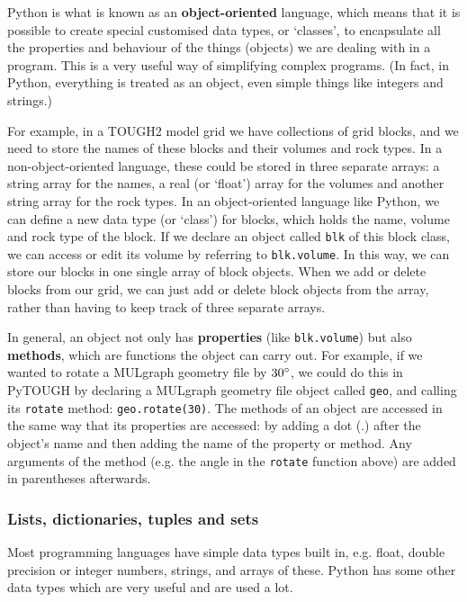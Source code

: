 Python is what is known as an \textbf{object-oriented} language, which means that it is possible to create special customised data types, or `classes', to encapsulate all the properties and behaviour of the things (objects) we are dealing with in a program.  This is a very useful way of simplifying complex programs.  (In fact, in Python, everything is treated as an object, even simple things like integers and strings.)

For example, in a TOUGH2 model grid we have collections of grid blocks, and we need to store the names of these blocks and their volumes and rock types.  In a non-object-oriented language, these could be stored in three separate arrays: a string array for the names, a real (or `float') array for the volumes and another string array for the rock types.  In an object-oriented language like Python, we can define a new data type (or `class') for blocks, which holds the name, volume and rock type of the block.  If we declare an object called \texttt{blk} of this block class, we can access or edit its volume by referring to \texttt{blk.volume}.  In this way, we can store our blocks in one single array of block objects.  When we add or delete blocks from our grid, we can just add or delete block objects from the array, rather than having to keep track of three separate arrays.

In general, an object not only has \textbf{properties} (like \texttt{blk.volume}) but also \textbf{methods}, which are functions the object can carry out.  For example, if we wanted to rotate a MULgraph geometry file by $30\degree$, we could do this in PyTOUGH by declaring a MULgraph geometry file object called \texttt{geo}, and calling its \texttt{rotate} method: \texttt{geo.rotate(30)}.  The methods of an object are accessed in the same way that its properties are accessed: by adding a dot (.) after the object's name and then adding the name of the property or method.  Any arguments of the method (e.g. the angle in the \texttt{rotate} function above) are added in parentheses afterwards.

\subsubsection{Lists, dictionaries, tuples and sets}

Most programming languages have simple data types built in, e.g. float, double precision or integer numbers, strings, and arrays of these.  Python has some other data types which are very useful and are used a lot.

